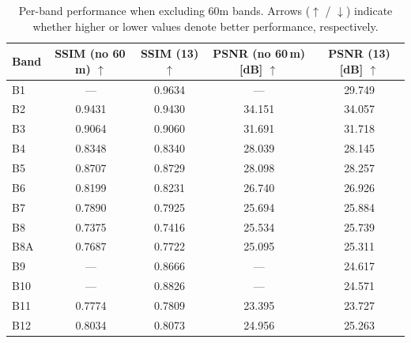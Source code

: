 \begin{table}[!htbp]
    \centering
    \setlength{\tabcolsep}{6pt}
    \renewcommand{\arraystretch}{1.15}
    \caption[Per-band performance when excluding 60m bands]{Per-band performance when excluding 60m bands. Arrows ($\uparrow$ / $\downarrow$) indicate whether higher or lower values denote better performance, respectively.}
    \label{tab:ablation_excluding_60m_per_band}
    \begin{tabular}{lcccc}
    \hline
    \textbf{Band} & \textbf{SSIM (no 60\,m)} $\uparrow$ & \textbf{SSIM (13)} $\uparrow$ & \textbf{PSNR (no 60\,m) [dB]} $\uparrow$ & \textbf{PSNR (13) [dB]} $\uparrow$ \\
    \hline
    B1   & ---    & 0.9634 & ---    & 29.749 \\
    B2   & 0.9431 & 0.9430 & 34.151 & 34.057 \\
    B3   & 0.9064 & 0.9060 & 31.691 & 31.718 \\
    B4   & 0.8348 & 0.8340 & 28.039 & 28.145 \\
    B5   & 0.8707 & 0.8729 & 28.098 & 28.257 \\
    B6   & 0.8199 & 0.8231 & 26.740 & 26.926 \\
    B7   & 0.7890 & 0.7925 & 25.694 & 25.884 \\
    B8   & 0.7375 & 0.7416 & 25.534 & 25.739 \\
    B8A  & 0.7687 & 0.7722 & 25.095 & 25.311 \\
    B9   & ---    & 0.8666 & ---    & 24.617 \\
    B10  & ---    & 0.8826 & ---    & 24.571 \\
    B11  & 0.7774 & 0.7809 & 23.395 & 23.727 \\
    B12  & 0.8034 & 0.8073 & 24.956 & 25.263 \\
    \hline
    \end{tabular}
\end{table}
